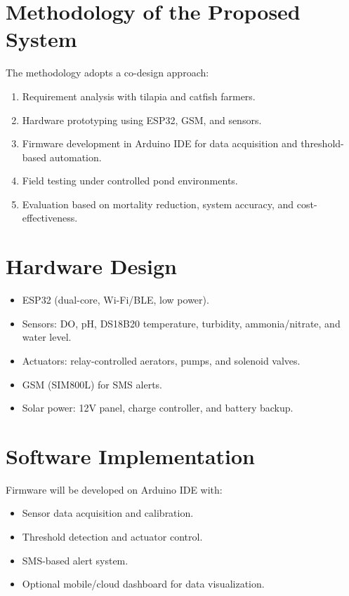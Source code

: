 \documentclass[12pt,a4paper]{report}
\begin{document}
\section{Methodology of the Proposed System}
The methodology adopts a co-design approach:
\begin{enumerate}
    \item Requirement analysis with tilapia and catfish farmers.
    \item Hardware prototyping using ESP32, GSM, and sensors.
    \item Firmware development in Arduino IDE for data acquisition and threshold-based automation.
    \item Field testing under controlled pond environments.
    \item Evaluation based on mortality reduction, system accuracy, and cost-effectiveness.
\end{enumerate}

\section{Hardware Design}
\begin{itemize}
    \item ESP32 (dual-core, Wi-Fi/BLE, low power).
    \item Sensors: DO, pH, DS18B20 temperature, turbidity, ammonia/nitrate, and water level.
    \item Actuators: relay-controlled aerators, pumps, and solenoid valves.
    \item GSM (SIM800L) for SMS alerts.
    \item Solar power: 12V panel, charge controller, and battery backup.
\end{itemize}

\section{Software Implementation}
Firmware will be developed on Arduino IDE with:
\begin{itemize}
    \item Sensor data acquisition and calibration.
    \item Threshold detection and actuator control.
    \item SMS-based alert system.
    \item Optional mobile/cloud dashboard for data visualization.
\end{itemize}
\end{document}
